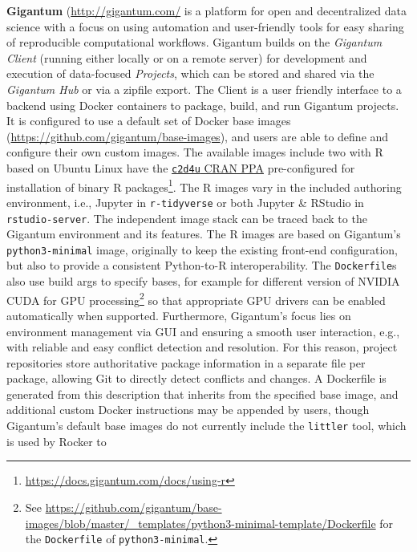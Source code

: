 \textbf{Gigantum} (\url{http://gigantum.com/} is a platform for open and
decentralized data science with a focus on using automation and
user-friendly tools for easy sharing of reproducible computational
workflows. Gigantum builds on the \emph{Gigantum Client} (running either
locally or on a remote server) for development and execution of
data-focused \emph{Projects}, which can be stored and shared via the
\emph{Gigantum Hub} or via a zipfile export. The Client is a user
friendly interface to a backend using Docker containers to package,
build, and run Gigantum projects. It is configured to use a default set
of Docker base images (\url{https://github.com/gigantum/base-images}),
and users are able to define and configure their own custom images. The
available images include two with R based on Ubuntu Linux have the
\href{https://launchpad.net/~marutter/+archive/ubuntu/c2d4u3.5/}{\texttt{c2d4u}
CRAN PPA} pre-configured for installation of binary R
packages\footnote{\href{https://docs.gigantum.com/docs/using-r}{https://docs.gigantum.com/docs/using-r}}.
The R images vary in the included authoring environment, i.e., Jupyter
in \texttt{r-tidyverse} or both Jupyter \& RStudio in
\texttt{rstudio-server}. The independent image stack can be traced back
to the Gigantum environment and its features. The R images are based on
Gigantum's \texttt{python3-minimal} image, originally to keep the
existing front-end configuration, but also to provide a consistent
Python-to-R interoperability. The \texttt{Dockerfile}s also use build
args to specify bases, for example for different version of NVIDIA CUDA
for GPU
processing\footnote{See \href{https://github.com/gigantum/base-images/blob/master/_templates/python3-minimal-template/Dockerfile}{https://github.com/gigantum/base-images/blob/master/\_templates/python3-minimal-template/Dockerfile} for the \texttt{Dockerfile} of \texttt{python3-minimal}.}
so that appropriate GPU drivers can be enabled automatically when
supported. Furthermore, Gigantum's focus lies on environment management
via GUI and ensuring a smooth user interaction, e.g., with reliable and
easy conflict detection and resolution. For this reason, project
repositories store authoritative package information in a separate file
per package, allowing Git to directly detect conflicts and changes. A
Dockerfile is generated from this description that inherits from the
specified base image, and additional custom Docker instructions may be
appended by users, though Gigantum's default base images do not
currently include the \texttt{littler} tool, which is used by Rocker to
